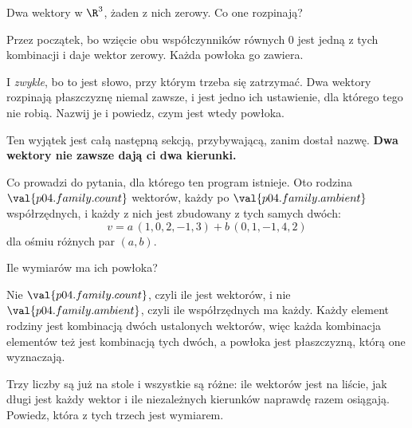 
\begin{fr}
Dwa wektory w $\R^{3}$, żaden z nich zerowy. Co one rozpinają?
\nextframe
\end{fr}

\begin{fr}
Przez początek, bo wzięcie obu współczynników równych $0$ jest jedną z tych
kombinacji i daje wektor zerowy. Każda powłoka go zawiera.

I \emph{zwykle}, bo to jest słowo, przy którym trzeba się zatrzymać. Dwa
wektory rozpinają płaszczyznę niemal zawsze, i jest jedno ich ustawienie, dla
którego tego nie robią. Nazwij je i powiedz, czym jest wtedy powłoka.
\dotline
\nextframe
\end{fr}

\begin{fr}

Ten wyjątek jest całą następną sekcją, przybywającą, zanim dostał nazwę.
\textbf{Dwa wektory nie zawsze dają ci dwa kierunki.}

Co prowadzi do pytania, dla którego ten program istnieje. Oto rodzina
$\val{p04.family.count}$ wektorów, każdy po $\val{p04.family.ambient}$
współrzędnych, i każdy z nich jest zbudowany z tych samych dwóch:
\[ v = a\,(1, 0, 2, -1, 3) + b\,(0, 1, -1, 4, 2) \]
dla ośmiu różnych par $(a, b)$.

Ile wymiarów ma ich powłoka?
\nextframe
\end{fr}

\begin{fr}
Nie $\val{p04.family.count}$, czyli ile jest wektorów, i nie
$\val{p04.family.ambient}$, czyli ile współrzędnych ma każdy. Każdy element
rodziny jest kombinacją dwóch ustalonych wektorów, więc każda kombinacja
elementów też jest kombinacją tych dwóch, a powłoka jest płaszczyzną, którą
one wyznaczają.

Trzy liczby są już na stole i wszystkie są różne: ile wektorów jest na liście,
jak długi jest każdy wektor i ile niezależnych kierunków naprawdę razem
osiągają. Powiedz, która z tych trzech jest wymiarem.
\dotline
\nextframe
\end{fr}

